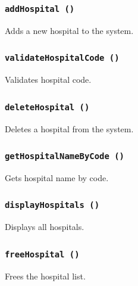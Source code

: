 \documentclass[12pt,a4paper]{report}
\begin{document}
\subsubsection{\texttt{addHospital ()}}
Adds a new hospital to the system.


\subsubsection{\texttt{validateHospitalCode ()}}
Validates hospital code.


\subsubsection{\texttt{deleteHospital ()}}
Deletes a hospital from the system.


\subsubsection{\texttt{getHospitalNameByCode ()}}
Gets hospital name by code.


\subsubsection{\texttt{displayHospitals ()}}
Displays all hospitals.


\subsubsection{\texttt{freeHospital ()}}
Frees the hospital list.

\end{document}
